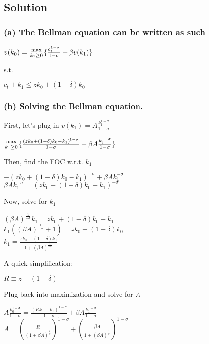 \documentclass[10pt, a4paper]{article}
\begin{document}
  \subsection*{Solution}
    \subsubsection*{(a) The Bellman equation can be written as such}
    \begin{center}
      $v(k_0)={\max\atop{k_1\geq0}}\{\frac{c_t^{1-\sigma}}{1-\sigma}+\beta v(k_1)\}$ \\
    \end{center}
    s.t.
    \begin{center}
      $c_t + k_1 \leq zk_0+(1-\delta)k_0$ \\
    \end{center}
    \subsubsection*{(b) Solving the Bellman equation.}
    First, let's plug in $v(k_1) = A\frac{k_1^{1-\sigma}}{1-\sigma}$
    \begin{center}
      ${\max\atop{k_1\geq0}}\{\frac{(zk_0+(1-\delta)k_0-k_1)^{1-\sigma}}{1-\sigma}+\beta A\frac{k_1^{1-\sigma}}{1-\sigma}\}$ \\
    \end{center}
    Then, find the FOC w.r.t. $k_1$
    \begin{center}
      $-(zk_0+(1-\delta)k_0-k_1)^{-\sigma}+\beta Ak_1^{-\sigma}$ \\
      $\beta Ak_1^{-\sigma}=(zk_0+(1-\delta)k_0-k_1)^{-\sigma}$ \\ 
    \end{center}
    Now, solve for $k_1$
    \begin{center}
      $(\beta A)^{\frac{1}{-\sigma}}k_1 = zk_0+(1-\delta)k_0-k_1$ \\
      $k_1((\beta A)^{\frac{1}{-\sigma}}+1)=zk_0+(1-\delta)k_0$ \\
      $\boxed{k_1 = \frac{zk_0+(1-\delta)k_0}{1+(\beta A)^{\frac{1}{-\sigma}}}}$ \\
    \end{center}
    A quick simplification:
    \begin{center}
      $R\equiv z+(1-\delta)$ \\
    \end{center}
    Plug back into maximization and solve for $A$
    \begin{center}
      $A\frac{k_0^{1-\sigma}}{1-\sigma}=\frac{(Rk_0-k_1)^{1-\sigma}}{1-\sigma}+\beta A\frac{k_1^{1-\sigma}}{1-\sigma}$ \\
      $\boxed{A = (\frac{R}{(1+\beta A)^{\frac{1}{\sigma}}})^{1-\sigma}+(\frac{\beta A}{1+(\beta A)^{\frac{1}{\sigma}}})^{1-\sigma}}$ \\
    \end{center}
\end{document}
